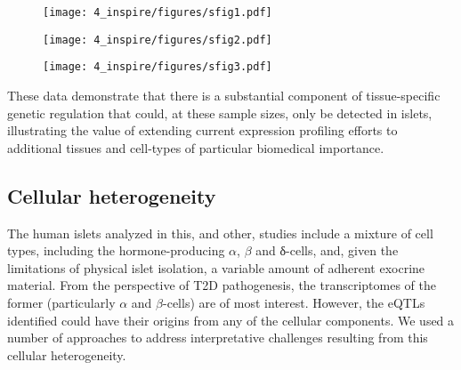 \begin{figure}
    \centering
    \texttt{[image: 4\_inspire/figures/sfig1.pdf]}
    \caption{}
    \label{fig:c4_sf1}
\end{figure}

\begin{figure}
    \centering
    \texttt{[image: 4\_inspire/figures/sfig2.pdf]}
    \caption{}
    \label{fig:c4_sf2}
\end{figure}

\begin{figure}
    \centering
    \texttt{[image: 4\_inspire/figures/sfig3.pdf]}
    \caption{}
    \label{fig:c4_sf3}
\end{figure}


These data demonstrate that there is a substantial component of tissue-specific genetic regulation that could, at these sample sizes, only be detected in islets, illustrating the value of extending current expression profiling efforts to additional tissues and cell-types of particular biomedical importance. 

\subsection{Cellular heterogeneity}	 	 	 	
The human islets analyzed in this, and other, studies include a mixture of cell types, including the hormone-producing $\alpha$, $\beta$ and δ-cells, and, given the limitations of physical islet isolation, a variable amount of adherent exocrine material. From the perspective of T2D pathogenesis, the transcriptomes of the former (particularly $\alpha$ and $\beta$-cells) are of most interest. However, the eQTLs identified could have their origins from any of the cellular components. We used a number of approaches to address interpretative challenges resulting from this cellular heterogeneity. \\
    
